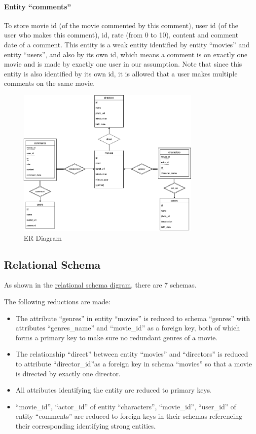 \begin{CJK*}{UTF8}{gbsn}
\paragraph{Entity ``comments''}
To store movie id (of the movie commented by this comment), user id (of the user who makes this comment), id, rate (from 0 to 10), content and comment date of a comment. This entity is a weak entity identified by entity ``movies'' and entity ``users'', and also by its own id, which means a comment is on exactly one movie and is made by exactly one user in our assumption. Note that since this entity is also identified by its own id, it is allowed that a user makes multiple comments on the same movie. 

\begin{figure}[h]
\centering
\label{ERD}
\includegraphics[width=0.8\textwidth]{er.png}
\caption{ER Diagram}
\end{figure}

\subsection{Relational Schema}
As shown in the \hyperref[RelationalSchema]{relational schema digram}, there are 7 schemas. 

The following reductions are made:
\begin{itemize}
\item The attribute ``genres'' in entity ``movies'' is reduced to schema ``genres'' with attributes ``genres\_name'' and ``movie\_id'' as a foreign key, both of which forms a primary key to make sure no redundant genres of a movie.
\item The relationship ``direct'' between entity ``movies'' and ``directors'' is reduced to attribute ``director\_id''as a foreign key in schema ``movies'' so that a movie is directed by exactly one director. 
\item All attributes identifying the entity are reduced to primary keys.
\item ``movie\_id'', ``actor\_id'' of entity ``characters'', ``movie\_id'', ``user\_id'' of entity ``comments'' are reduced to foreign keys in their schemas referencing their corresponding identifying strong entities. 
\end{itemize}


\end{CJK*}
